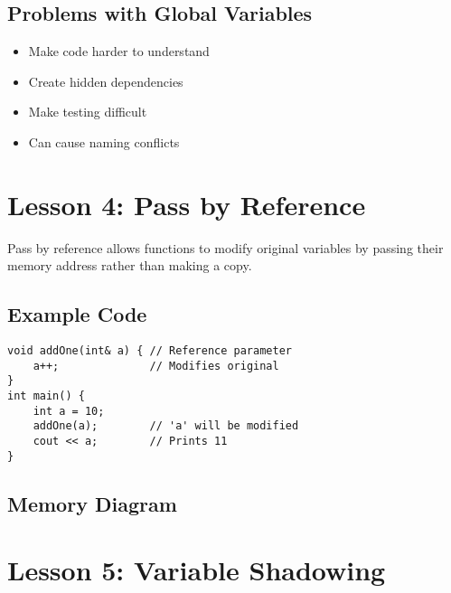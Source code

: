 \documentclass{article}
\begin{document}
\subsection{Problems with Global Variables}
\begin{itemize}[label=$\times$]
    \item Make code harder to understand
    \item Create hidden dependencies
    \item Make testing difficult
    \item Can cause naming conflicts
\end{itemize}

\section{Lesson 4: Pass by Reference}

\begin{conceptbox}
Pass by reference allows functions to modify original variables by passing their memory address rather than making a copy.
\end{conceptbox}

\subsection{Example Code}
\begin{lstlisting}
void addOne(int& a) { // Reference parameter
    a++;              // Modifies original
}
int main() {
    int a = 10;
    addOne(a);        // 'a' will be modified
    cout << a;        // Prints 11
}
\end{lstlisting}

\subsection{Memory Diagram}
\begin{center}
\end{center}

\section{Lesson 5: Variable Shadowing}
\end{document}
